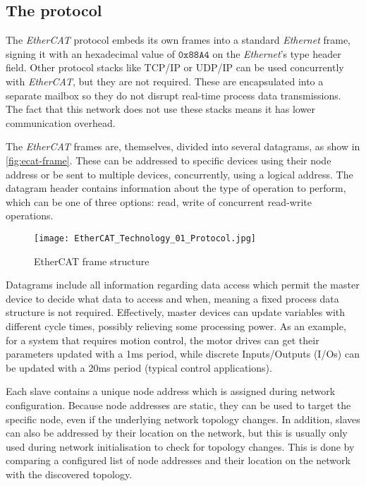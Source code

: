 \subsection{The protocol} \label{subsec:ecat-protocol}

The \emph{EtherCAT} protocol embeds its own frames into a standard \emph{Ethernet} frame, signing it with an hexadecimal value of $\mathtt{0x88A4}$ on the \emph{Ethernet}'s type header field.
Other protocol stacks like TCP/IP or UDP/IP can be used concurrently with \emph{EtherCAT}, but they are not required.
These are encapsulated into a separate mailbox so they do not disrupt real-time process data transmissions.
The fact that this network does not use these stacks means it has lower communication overhead.

The \emph{EtherCAT} frames are, themselves, divided into several datagrams, as show in \autoref{fig:ecat-frame}.
These can be addressed to specific devices using their node address or be sent to multiple devices, concurrently, using a logical address.
The datagram header contains information about the type of operation to perform, which can be one of three options: read, write of concurrent read-write operations.

\begin{figure}[htp]
	\centering
	\texttt{[image: EtherCAT\_Technology\_01\_Protocol.jpg]}
	\caption{EtherCAT frame structure \cite{protocol:ethercat}}
	\label{fig:ecat-frame}
\end{figure}

Datagrams include all information regarding data access which permit the master device to decide what data to access and when, meaning a fixed process data structure is not required.
Effectively, master devices can update variables with different cycle times, possibly relieving some processing power.
As an example, for a system that requires motion control, the motor drives can get their parameters updated with a 1ms period, while discrete Inputs/Outputs (I/Os) can be updated with a 20ms period (typical control applications).

Each slave contains a unique node address which is assigned during network configuration.
Because node addresses are static, they can be used to target the specific node, even if the underlying network topology changes.
In addition, slaves can also be addressed by their location on the network, but this is usually only used during network initialisation to check for topology changes.
This is done by comparing a configured list of node addresses and their location on the network with the discovered topology.

